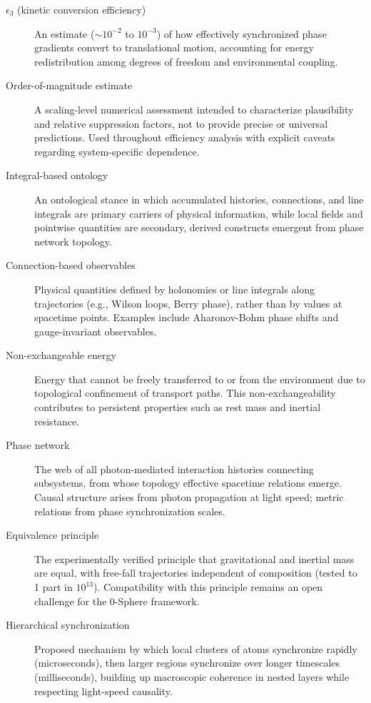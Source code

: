 \documentclass[12pt,letterpaper]{article}
\begin{document}
\begin{description}
\item[$\epsilon_3$ (kinetic conversion efficiency)] An estimate ($\sim 10^{-2}$ to $10^{-3}$) of how effectively synchronized phase gradients convert to translational motion, accounting for energy redistribution among degrees of freedom and environmental coupling.

\item[Order-of-magnitude estimate] A scaling-level numerical assessment intended to characterize plausibility and relative suppression factors, not to provide precise or universal predictions. Used throughout efficiency analysis with explicit caveats regarding system-specific dependence.

\item[Integral-based ontology] An ontological stance in which accumulated histories, connections, and line integrals are primary carriers of physical information, while local fields and pointwise quantities are secondary, derived constructs emergent from phase network topology.

\item[Connection-based observables] Physical quantities defined by holonomies or line integrals along trajectories (e.g., Wilson loops, Berry phase), rather than by values at spacetime points. Examples include Aharonov-Bohm phase shifts and gauge-invariant observables.

\item[Non-exchangeable energy] Energy that cannot be freely transferred to or from the environment due to topological confinement of transport paths. This non-exchangeability contributes to persistent properties such as rest mass and inertial resistance.

\item[Phase network] The web of all photon-mediated interaction histories connecting subsystems, from whose topology effective spacetime relations emerge. Causal structure arises from photon propagation at light speed; metric relations from phase synchronization scales.

\item[Equivalence principle] The experimentally verified principle that gravitational and inertial mass are equal, with free-fall trajectories independent of composition (tested to 1 part in $10^{13}$). Compatibility with this principle remains an open challenge for the 0-Sphere framework.

\item[Hierarchical synchronization] Proposed mechanism by which local clusters of atoms synchronize rapidly (microseconds), then larger regions synchronize over longer timescales (milliseconds), building up macroscopic coherence in nested layers while respecting light-speed causality.


\end{description}
\end{document}
